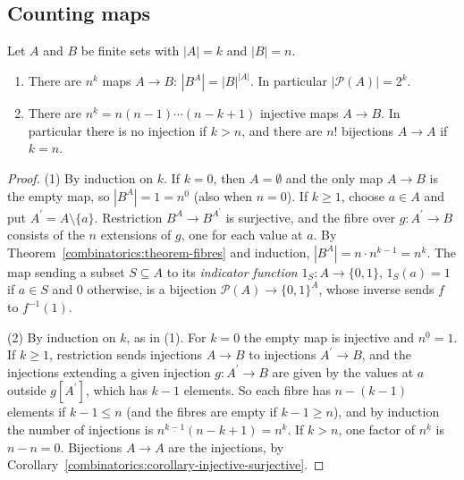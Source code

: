 \subsection{Counting maps}\label{combinatorics:subsection-maps}

\begin{theorem}\label{combinatorics:theorem-counting-maps}
Let $A$ and $B$ be finite sets with $|A| = k$ and $|B| = n$.
\begin{enumerate}
\item There are $n^k$ maps $A \to B$: $|B^A| = |B|^{|A|}$. In particular $|\mathcal{P}(A)| = 2^{k}$.
\item There are $n^{\underline{k}} = n(n - 1) \cdots (n - k + 1)$ injective maps $A \to B$. In particular there is no injection if $k > n$, and there are $n!$ bijections $A \to A$ if $k = n$.
\end{enumerate}
\end{theorem}

\begin{proof}
(1) By induction on $k$. If $k = 0$, then $A = \emptyset$ and the only map $A \to B$ is the empty map, so $|B^A| = 1 = n^0$ (also when $n = 0$). If $k \geq 1$, choose $a \in A$ and put
$A^{\prime} = A \setminus \{a\}$. Restriction $B^A \to B^{A^{\prime}}$ is surjective, and the fibre over $g \colon A^{\prime} \to B$ consists of the $n$ extensions of $g$, one for each value at $a$.
By Theorem~\ref{combinatorics:theorem-fibres} and induction, $|B^A| = n \cdot n^{k-1} = n^k$. The map sending a subset $S \subseteq A$ to its \emph{indicator function} $1_S \colon A \to \{0, 1\}$,
$1_S(a) = 1$ if $a \in S$ and $0$ otherwise, is a bijection $\mathcal{P}(A) \to \{0, 1\}^A$, whose inverse sends $f$ to $f^{-1}(1)$.

(2) By induction on $k$, as in (1). For $k = 0$ the empty map is injective and $n^{\underline{0}} = 1$. If $k \geq 1$, restriction sends injections $A \to B$ to injections $A^{\prime} \to B$, and the
injections extending a given injection $g \colon A^{\prime} \to B$ are given by the values at $a$ outside $g[A^{\prime}]$, which has $k - 1$ elements. So each fibre has $n - (k - 1)$ elements if
$k - 1 \leq n$ (and the fibres are empty if $k - 1 \geq n$), and by induction the number of injections is $n^{\underline{k-1}}(n - k + 1) = n^{\underline{k}}$. If $k > n$, one factor of
$n^{\underline{k}}$ is $n - n = 0$. Bijections $A \to A$ are the injections, by Corollary~\ref{combinatorics:corollary-injective-surjective}.
\end{proof}

